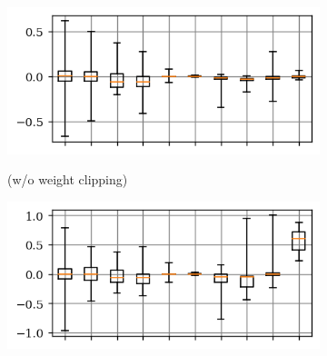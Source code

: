 \begin{figure}[t]
	\centering
	\vspace*{-0.2cm}
	\begin{subfigure}{0.35\textwidth}
		\vspace*{0px}
		\centering
		\Quant
		
		\includegraphics[width=1\textwidth]{c10_weights_q81auunrfp_nt.png}
	\end{subfigure}
	\begin{subfigure}{0.35\textwidth}
		\vspace*{0px}
		\centering
		\Random (w/o weight clipping)
		
		\includegraphics[width=1\textwidth]{c10_weights_q81auunrfp_sawt_bit_random_g001_pop1.png}
	\end{subfigure}
	\\
	\begin{subfigure}{0.35\textwidth}
		\vspace*{0px}
		\centering
		\Clipping[$0.1$]
			

\end{subfigure}
\end{figure}
